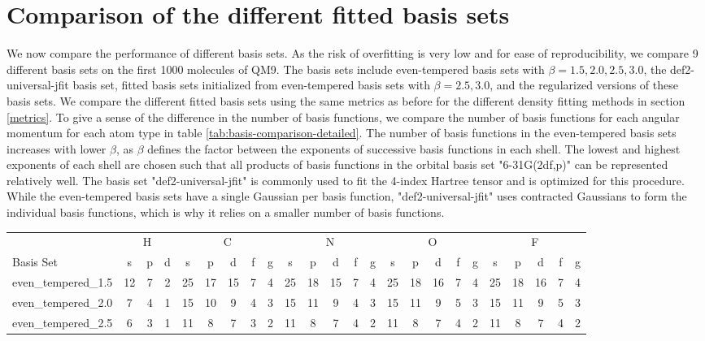 {\section{Comparison of the different fitted basis sets}
We now compare the performance of different basis sets. As the risk of overfitting is very low and for ease of reproducibility, we compare 9 different basis sets on the first 1000 molecules of QM9. The basis sets include even-tempered basis sets with $\beta = 1.5,2.0,2.5,3.0$, the def2-universal-jfit basis set, fitted basis sets initialized from even-tempered basis sets with $\beta = 2.5,3.0$, and the regularized versions of these basis sets. We compare the different fitted basis sets using the same metrics as before for the different density fitting methods in section \ref{metrics}. To give a sense of the difference in the number of basis functions, we compare the number of basis functions for each angular momentum for each atom type in table \ref{tab:basis-comparison-detailed}. The number of basis functions in the even-tempered basis sets increases with lower $\beta$, as $\beta$ defines the factor between the exponents of successive basis functions in each shell. The lowest and highest exponents of each shell are chosen such that all products of basis functions in the orbital basis set "6-31G(2df,p)" can be represented relatively well. The basis set "def2-universal-jfit" is commonly used to fit the 4-index Hartree tensor and is optimized for this procedure. While the even-tempered basis sets have a single Gaussian per basis function, "def2-universal-jfit" uses contracted Gaussians to form the individual basis functions, which is why it relies on a smaller number of basis functions.\\
\begin{table}
\centering
\tiny
\begin{tabular}{|l|ccc|ccccc|ccccc|ccccc|ccccc|}
\hline
& \multicolumn{3}{c|}{H} & \multicolumn{5}{c|}{C} & \multicolumn{5}{c|}{N} & \multicolumn{5}{c|}{O} & \multicolumn{5}{c|}{F} \\
Basis Set & s & p & d & s & p & d & f & g & s & p & d & f & g & s & p & d & f & g & s & p & d & f & g \\
\hline
even\_tempered\_1.5 & 12 & 7 & 2 & 25 & 17 & 15 & 7 & 4 & 25 & 18 & 15 & 7 & 4 & 25 & 18 & 16 & 7 & 4 & 25 & 18 & 16 & 7 & 4 \\
even\_tempered\_2.0 & 7 & 4 & 1 & 15 & 10 & 9 & 4 & 3 & 15 & 11 & 9 & 4 & 3 & 15 & 11 & 9 & 5 & 3 & 15 & 11 & 9 & 5 & 3 \\
even\_tempered\_2.5 & 6 & 3 & 1 & 11 & 8 & 7 & 3 & 2 & 11 & 8 & 7 & 4 & 2 & 11 & 8 & 7 & 4 & 2 & 11 & 8 & 7 & 4 & 2 \\

\end{tabular}
\end{table}}
